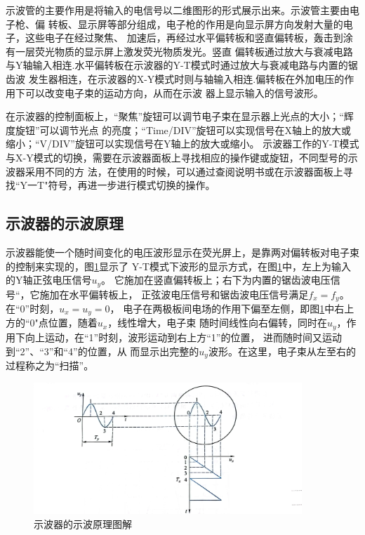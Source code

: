 \documentclass{ctexart}
\begin{document}
  示波管的主要作用是将输入的电信号以二维图形的形式展示出来。示波管主要由电子枪、偏
  转板、显示屏等部分组成，电子枪的作用是向显示屏方向发射大量的电子，这些电子在经过聚焦、
  加速后，再经过水平偏转板和竖直偏转板，轰击到涂有一层荧光物质的显示屏上激发荧光物质发光。竖直
  偏转板通过放大与衰减电路与Y轴输入相连.水平偏转板在示波器的Y-T模式时通过放大与衰减电路与内置的锯齿波
  发生器相连，在示波器的X-Y模式时则与轴输入相连.偏转板在外加电压的作用下可以改变电子束的运动方向，从而在示波
  器上显示输入的信号波形。

  在示波器的控制面板上，“聚焦”旋钮可以调节电子束在显示器上光点的大小；“辉度旋钮”可以调节光点
  的亮度；“Time/DIV”旋钮可以实现信号在X轴上的放大或缩小；“V/DIV”旋钮可以实现信号在Y轴上的放大或缩小。
  示波器工作的Y-T模式与X-Y模式的切换，需要在示波器面板上寻找相应的操作键或旋钮，不同型号的示波器采用不同的方
  法，在使用的时候，可以通过查阅说明书或在示波器面板上寻找“Y一T"符号，再进一步进行模式切换的操作。

  \subsection{示波器的示波原理}
  示波器能使一个随时间变化的电压波形显示在荧光屏上，是靠两对偏转板对电子束的控制来实现的，图\ref{shiboyuanli}显示了
  Y-T模式下波形的显示方式，在图\ref{shiboyuanli}中，左上为输入的Y轴正弦电压信号$u_{y}$。
  它施加在竖直偏转板上；右下为内置的锯齿波电压信号“，它施加在水平偏转板上，
  正弦波电压信号和锯齿波电压信号满足$f_{x}=f_{y}$。在“0”时刻，$u_{x}=u_{y}=0$，
  电子在两极板间电场的作用下偏至左侧，即图\ref{shiboyuanli}中右上方的“0"点位置，随着$u_{x}$，线性增大，电子束
  随时间线性向右偏转，同时在$u_{y}$，作用下向上运动，在“1”时刻，波形运动到右上方“1”的位置，
  进而随时间又运动到“2”、“3”和“4”的位置，从
  而显示出完整的$u_{y}$波形。在这里，电子束从左至右的过程称之为“扫描”。
  \begin{figure}[bt]\label{shiboyuanli}
    \centering
    \includegraphics[width=0.9\textwidth,height=0.3\textheight]{shiboyuanli.jpg}
    \caption{示波器的示波原理图解}
  \end{figure}
\end{document}
